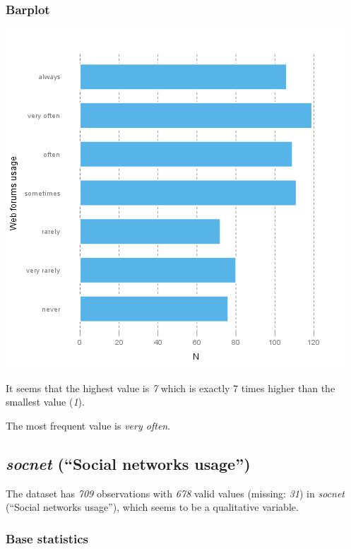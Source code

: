 \documentclass[]{article}
\makeatletter
\def\maxwidth{\ifdim\Gin@nat@width>\linewidth\linewidth
\else\Gin@nat@width\fi}
\let\Oldincludegraphics\includegraphics
\renewcommand{\includegraphics}[1]{\Oldincludegraphics[width=\maxwidth]{#1}}
\makeatother
\begin{document}
\subsubsection{Barplot}

\href{/tmp/RtmpeIwHkw/file3ebe4451-hires.png}{\includegraphics{e866a67bba62e7f5cbe93b184599019f.png}}

It seems that the highest value is \emph{7} which is exactly 7 times
higher than the smallest value (\emph{1}).

The most frequent value is \emph{very often}.

\subsection{\emph{socnet} (``Social networks usage'')}

The dataset has \emph{709} observations with \emph{678} valid values
(missing: \emph{31}) in \emph{socnet} (``Social networks usage''), which
seems to be a qualitative variable.

\subsubsection{Base statistics}
\end{document}
